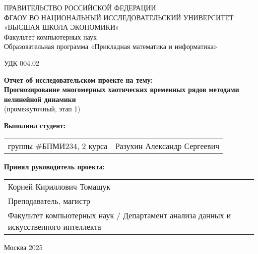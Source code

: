 \documentclass[a4paper, 12pt]{extarticle}
\begin{document}
{
\begin{center}
ПРАВИТЕЛЬСТВО РОССИЙСКОЙ ФЕДЕРАЦИИ\\
ФГАОУ ВО НАЦИОНАЛЬНЫЙ ИССЛЕДОВАТЕЛЬСКИЙ УНИВЕРСИТЕТ\\
«ВЫСШАЯ ШКОЛА ЭКОНОМИКИ»
\\
\bigskip
Факультет компьютерных наук\\
Образовательная программа «Прикладная математика и информатика»
\end{center}
}

\vspace{2em}
УДК 004.02
\vspace{4em}

\begin{center}
    {\bf Отчет об исследовательском проекте на тему:}\\
    {\bf Прогнозирование многомерных хаотических временных рядов методами нелинейной динамики}\\
    (промежуточный, этап 1)
\end{center}
    
\vspace{2em}
    
{\bf Выполнил студент: \vspace{2mm}}
    
{
\begin{tabular}{l@{\hskip 1.5cm}l}
    группы \#БПМИ234, 2 курса & Разухин Александр Сергеевич \\
\end{tabular}}


\vspace{1em}
{\bf Принял руководитель проекта: \vspace{2mm}}
    
{
\begin{tabular}{l}
    Корней Кириллович Томащук\\
    Преподаватель, магистр\\
    Факультет компьютерных наук / Департамент анализа данных и искусственного интеллекта
\end{tabular}}

\vspace{\fill}

\begin{center}
Москва 2025
\end{center}

\newpage

\begin{abstract}
Работа над данным проектом предполагает исследование методов прогнозирования временных рядов, основанных на использовании информации, полученной из других рядов, которые по некоторым критериям "подходят" для конкретной задачи.
\end{abstract}
\end{document}
